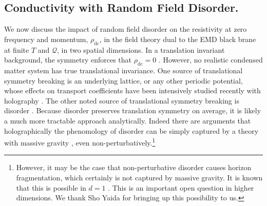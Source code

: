 \documentclass[10pt, oneside]{book}
\begin{document}
\begin{doublespace}
\section{Conductivity with Random Field Disorder.}
We now discuss the impact of random field disorder on the
resistivity at zero frequency and momentum, $\rho_{\mathrm{dc}}$, in the field theory dual to the EMD black brane at finite $T$ and $\mathcal{Q}$, in two spatial dimensions. 
In a translation invariant background, the symmetry enforces %
 that $\rho_{\mathrm{dc}}=0$ \cite{forster1995}.  However, no realistic condensed matter system has true translational invariance.  One source of translational symmetry breaking is an underlying lattice, or any other periodic potential, whose effects on transport coefficients have been intensively studied recently with holography \cite{Hartnoll:2012rj,Horowitz:2012ky,Liu:2012tr,Hutasoit:2012ib, Horowitz:2012gs, Horowitz:2013jaa, Chesler:2013qla,Ling:2013nxa, Donos:2013eha,Andrade:2013gsa,Balasubramanian:2013yqa,Donos:2014uba}.  %
The other noted
 source of translational symmetry breaking is %
 disorder \cite{hkms,Hartnoll:2008hs,Adams:2011rj,Adams:2012yi,Arean:2013mta}. %
 Because disorder preserves translation symmetry on average, it is likely a much more tractable approach analytically. %
Indeed there are arguments that holographically the phenomology of disorder can be simply captured by a theory with massive gravity \cite{Vegh:2013sk, Davison:2013jba}, even non-perturbatively.\footnote{However, it may be the case that non-perturbative disorder causes horizon fragmentation, which certainly is not captured by massive gravity.   It is known that this is possible in $d=1$ \cite{Brill:1998pr}.   This is an important open question in higher dimensions.  We thank Sho Yaida for bringing up this possibility to us.} 


\end{doublespace}
\end{document}
